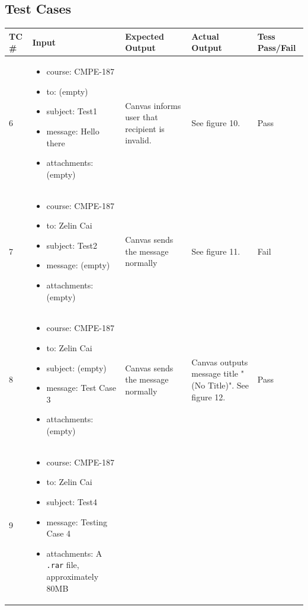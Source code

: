 \documentclass[10pt,letterpaper]{article}
\begin{document}
\newpage
\subsection{Test Cases}
\begin{table}[h!]
\begin{tabularx}{\textwidth}{lXXXl}
\toprule
TC \# &
  Input &
  Expected Output &
  Actual Output &
  Tess Pass/Fail \\ \midrule
6 &
  \begin{itemize}
    \item{course: CMPE-187}
    \item{to: (empty)}
    \item{subject: Test1}
    \item{message: Hello there}
    \item{attachments: (empty)}
  \end{itemize} &
   Canvas informs user that recipient is invalid. &
   See figure 10. &
   Pass \\ \midrule
7 &
  \begin{itemize}
    \item{course: CMPE-187}
    \item{to: Zelin Cai}
    \item{subject: Test2}
    \item{message: (empty)}
    \item{attachments: (empty)}
  \end{itemize} &
   Canvas sends the message normally &
   See figure 11. &
   Fail \\ \midrule
8 &
  \begin{itemize}
    \item{course: CMPE-187}
    \item{to: Zelin Cai}
    \item{subject: (empty)}
    \item{message: Test Case 3}
    \item{attachments: (empty)}
  \end{itemize} &
   Canvas sends the message normally &
   Canvas outputs message title "(No Title)". See figure 12. &
   Pass \\ \midrule
9 &
  \begin{itemize}
    \item{course: CMPE-187}
    \item{to: Zelin Cai}
    \item{subject: Test4}
    \item{message: Testing Case 4}
    \item{attachments: A \texttt{.rar} file, approximately 80MB}

\end{itemize}
\end{tabularx}
\end{table}
\end{document}

